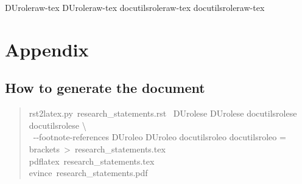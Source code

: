 \documentclass[a4paper]{article}
\providecommand*{\DUrole}[2]{%
  \ifcsname DUrole#1\endcsname%
    \csname DUrole#1\endcsname{#2}%
  \else%
    \ifcsname docutilsrole#1\endcsname%
      \csname docutilsrole#1\endcsname{#2}%
    \else%
      #2%
    \fi%
  \fi%
}
\begin{document}
\DUrole{raw-tex}{\newpage}


\section{Appendix%
  \label{appendix}%
}


\subsection{How to generate the document%
  \label{how-to-generate-the-document}%
}
%
\begin{quote}{\ttfamily \raggedright \noindent
rst2latex.py~research\_statements.rst~\DUrole{se}{\textbackslash{}\\
}~-{}-footnote-references\DUrole{o}{=}brackets~>~research\_statements.tex\\
pdflatex~research\_statements.tex\\
evince~research\_statements.pdf
}
\end{quote}
\end{document}
